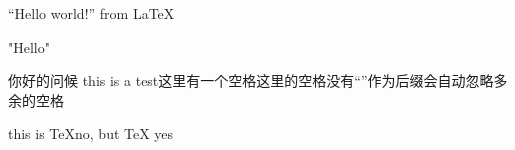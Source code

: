 \documentclass[UTF8]{ctexart}
\begin{document}
``Hello world!'' from \LaTeX

"Hello"

你好的问候 this is   a test这里有一个空格这里的空格没有“{}”作为后缀会自动忽略多余的空格

this is \TeX no, but \TeX{} yes
\end{document}

